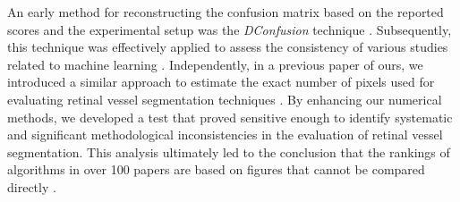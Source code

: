 \documentclass[5p, final]{elsarticle}
\begin{document}
An early method for reconstructing the confusion matrix based on the reported scores and the experimental setup was the \emph{DConfusion} technique \cite{dconfusion}. Subsequently, this technique was effectively applied to assess the consistency of various studies related to machine learning \cite{errorsml}.
Independently, in a previous paper of ours, we introduced a similar approach to estimate the exact number of pixels used for evaluating retinal vessel segmentation techniques \cite{vesselsegm}. By enhancing our numerical methods, we developed a test that proved sensitive enough to identify systematic and significant methodological inconsistencies in the evaluation of retinal vessel segmentation. This analysis ultimately led to the conclusion that the rankings of algorithms in over 100 papers are based on figures that cannot be compared directly \cite{vessel}.
\end{document}
